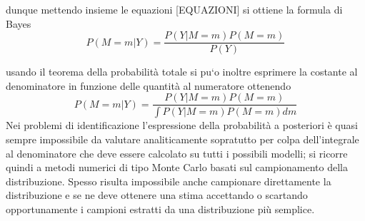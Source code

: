 \documentclass[10pt,a4paper,oneside,openany,noindent]{book}
\begin{document}
dunque mettendo insieme le equazioni [EQUAZIONI] si ottiene la formula di Bayes
\begin{equation}
P (M = m|Y ) =\frac{
P (Y |M = m)P (M = m)}{
P (Y )}
\end{equation}

usando il teorema della probabilità totale si pu`o inoltre esprimere la costante al
denominatore in funzione delle quantità al numeratore ottenendo
\begin{equation}
P (M = m|Y ) =\frac{
P (Y |M = m)P (M = m)}{\int
P (Y |M = m)P (M = m)dm}
\end{equation}
Nei problemi di identificazione l’espressione della probabilità a posteriori è quasi
sempre impossibile da valutare analiticamente sopratutto per colpa dell’integrale al
denominatore che deve essere calcolato su tutti i possibili modelli; si ricorre quindi a
metodi numerici di tipo Monte Carlo basati sul campionamento della distribuzione.
Spesso risulta impossibile anche campionare direttamente la distribuzione e se ne
deve ottenere una stima accettando o scartando opportunamente i campioni estratti
da una distribuzione più semplice.
\end{document}
